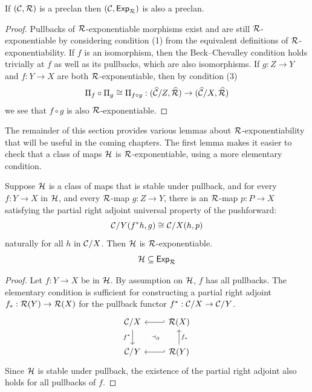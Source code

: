 \begin{proposition} \label{prop:exp-clan}
  If $(\mathcal{C},\mathcal{R})$ is a preclan
  then $(\mathcal{C},\mathsf{Exp}_{\mathcal{R}})$ is also a preclan.
\end{proposition}
\begin{proof}
  Pullbacks of $\mathcal{R}$-exponentiable morphisms exist and
  are still $\mathcal{R}$-exponentiable by considering condition (1)
  from the equivalent definitions of $\mathcal{R}$-exponentiability.
  If $f$ is an isomorphism, then the Beck--Chevalley condition holds trivially
  at $f$ as well as its pullbacks, which are also isomorphisms.
  If $g : Z \to Y$ and $f : Y \to X$ are both $\mathcal{R}$-exponentiable,
  then by condition (3)
  \[\Pi_f \circ \Pi_g \cong \Pi_{f \circ g} : (\widehat{\mathcal{C}}/Z, \widehat{\mathcal{R}}) \to (\widehat{\mathcal{C}}/X, \widehat{\mathcal{R}})\]
  we see that $f \circ g$ is also $\mathcal{R}$-exponentiable.
\end{proof}

The remainder of this section provides various lemmas
about $\mathcal{R}$-exponentiability that will be useful in the coming chapters.
The first lemma 
makes it easier to check that a class of maps $\mathcal{H}$ is $\mathcal{R}$-exponentiable,
using a more elementary condition.

\begin{lemma}\label{lem:stable-class-of-exponentiable-maps}
  Suppose $\mathcal{H}$ is a class of maps that is stable under pullback,
  and for every $f : Y \to X$ in $\mathcal{H}$,
  and every $\mathcal{R}$-map $g : Z \to Y$, 
  there is an $\mathcal{R}$-map $p : P \to X$ satisfying the partial right adjoint
  universal property of the pushforward:
  \[ \mathcal{C} / Y (f^* h, g) \cong \mathcal{C} / X (h,p)\]
  naturally for all $h$ in $\mathcal{C} / X$.
  Then $\mathcal{H}$ is $\mathcal{R}$-exponentiable.
  \[\mathcal{H} \subseteq \mathsf{Exp}_{\mathcal{R}}\]
\end{lemma}
\begin{proof}
  Let $f : Y \to X$ be in $\mathcal{H}$.
  By assumption on $\mathcal{H}$, $f$ has all pullbacks.
  The elementary condition is sufficient for constructing a
  partial right adjoint $f_* : \mathcal{R}(Y) \to \mathcal{R}(X)$
  for the pullback functor $f^* : \mathcal{C} / X \to \mathcal{C} / Y$.
  \[\begin{tikzcd}
    \CC / X & {\RR(X)} \\
    \CC / Y & {\RR(Y)}
    \arrow[""{name=0, anchor=center, inner sep=0}, "f^*"', from=1-1, to=2-1]
    \arrow[hook', from=1-2, to=1-1]
    \arrow[""{name=1, anchor=center, inner sep=0}, "{f_*}"', from=2-2, to=1-2]
    \arrow[hook', from=2-2, to=2-1]
    \arrow["{\dashv_\partial}"{description}, draw=none, from=0, to=1]
  \end{tikzcd}\]
  Since $\mathcal{H}$ is stable under pullback,
  the existence of the partial right adjoint also holds for all pullbacks of $f$.
\end{proof}

